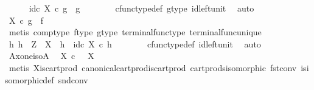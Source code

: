 \begin{isabellebody}
\ \ \ \ \isamarkupfalse%
\ {\isachardoublequoteopen}id\isactrlsub c\ X\ {\isasymcirc}\isactrlsub c\ g\ {\isacharequal}{\kern0pt}\ g{\isachardoublequoteclose}\isanewline
\ \ \ \ \ \ \isamarkupfalse%
\ cfunc{\isacharunderscore}{\kern0pt}type{\isacharunderscore}{\kern0pt}def\ g{\isacharunderscore}{\kern0pt}type\ id{\isacharunderscore}{\kern0pt}left{\isacharunderscore}{\kern0pt}unit\ \isamarkupfalse%
\ auto\isanewline
\ \ \ \ \isamarkupfalse%
\ {\isachardoublequoteopen}{\isasymbeta}\isactrlbsub X\isactrlesub \ {\isasymcirc}\isactrlsub c\ g\ {\isacharequal}{\kern0pt}\ f{\isachardoublequoteclose}\isanewline
\ \ \ \ \ \ \isamarkupfalse%
\ {\isacharparenleft}{\kern0pt}metis\ comp{\isacharunderscore}{\kern0pt}type\ f{\isacharunderscore}{\kern0pt}type\ g{\isacharunderscore}{\kern0pt}type\ terminal{\isacharunderscore}{\kern0pt}func{\isacharunderscore}{\kern0pt}type\ terminal{\isacharunderscore}{\kern0pt}func{\isacharunderscore}{\kern0pt}unique{\isacharparenright}{\kern0pt}\isanewline
\ \ \ \ \isamarkupfalse%
\ {\isachardoublequoteopen}{\isasymAnd}h{}{\isachardot}{\kern0pt}\ h{}\ {\isacharcolon}{\kern0pt}\ Z\ {\isasymrightarrow}\ X\ {\isasymLongrightarrow}\ h{}\ {\isacharequal}{\kern0pt}\ id\isactrlsub c\ X\ {\isasymcirc}\isactrlsub c\ h{}{\isachardoublequoteclose}\isanewline
\ \ \ \ \ \ \isamarkupfalse%
\ cfunc{\isacharunderscore}{\kern0pt}type{\isacharunderscore}{\kern0pt}def\ id{\isacharunderscore}{\kern0pt}left{\isacharunderscore}{\kern0pt}unit\ \isamarkupfalse%
\ auto\isanewline
\ \ \isamarkupfalse%
\isanewline
{}\isamarkupfalse%
%
\endisatagproof
{\isafoldproof}%
%
\isadelimproof
\isanewline
%
\endisadelimproof
\isanewline
{}\isamarkupfalse%
\ A{\isacharunderscore}{\kern0pt}x{\isacharunderscore}{\kern0pt}one{\isacharunderscore}{\kern0pt}iso{\isacharunderscore}{\kern0pt}A{\isacharcolon}{\kern0pt}\isanewline
\ \ {\isachardoublequoteopen}X\ {\isasymtimes}\isactrlsub c\ {\isasymone}\ {\isasymcong}\ X{\isachardoublequoteclose}\isanewline
%
\isadelimproof
\ \ %
\endisadelimproof
%
\isatagproof
{}\isamarkupfalse%
\ {\isacharparenleft}{\kern0pt}metis\ X{\isacharunderscore}{\kern0pt}is{\isacharunderscore}{\kern0pt}cart{\isacharunderscore}{\kern0pt}prod{}\ canonical{\isacharunderscore}{\kern0pt}cart{\isacharunderscore}{\kern0pt}prod{\isacharunderscore}{\kern0pt}is{\isacharunderscore}{\kern0pt}cart{\isacharunderscore}{\kern0pt}prod\ cart{\isacharunderscore}{\kern0pt}prods{\isacharunderscore}{\kern0pt}isomorphic\ fst{\isacharunderscore}{\kern0pt}conv\ is{\isacharunderscore}{\kern0pt}isomorphic{\isacharunderscore}{\kern0pt}def\ snd{\isacharunderscore}{\kern0pt}conv{\isacharparenright}{\kern0pt}%

\end{isabellebody}

